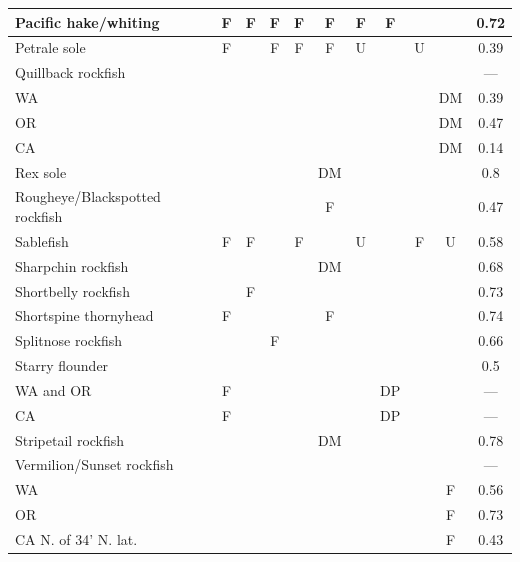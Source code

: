 \documentclass[11pt,
  english,
  a4paper,
]{article}
\begin{document}
\begin{landscape}
\begin{longtable}[t]{>{\raggedright\arraybackslash}p{6cm}lcccccccccc}
\midrule
Pacific hake/whiting &  & F & F & F & F & F & F & F &  &  & 0.72\\
\midrule
Petrale sole &  & F &  & F & F & F & U &  & U &  & 0.39\\
\midrule
Quillback rockfish &  &  &  &  &  &  &  &  &  &  & ---\\
\midrule
\hspace{3mm}WA &  &  &  &  &  &  &  &  &  & DM & 0.39\\
\midrule
\hspace{3mm}OR &  &  &  &  &  &  &  &  &  & DM & 0.47\\
\midrule
\hspace{3mm}CA &  &  &  &  &  &  &  &  &  & DM & 0.14\\
\midrule
Rex sole &  &  &  &  &  & DM &  &  &  &  & 0.8\\
\midrule
Rougheye/Blackspotted rockfish &  &  &  &  &  & F &  &  &  &  & 0.47\\
\midrule
Sablefish &  & F & F &  & F &  & U &  & F & U & 0.58\\
\midrule
Sharpchin rockfish &  &  &  &  &  & DM &  &  &  &  & 0.68\\
\midrule
Shortbelly rockfish &  &  & F &  &  &  &  &  &  &  & 0.73\\
\midrule
Shortspine thornyhead &  & F &  &  &  & F &  &  &  &  & 0.74\\
\midrule
Splitnose rockfish &  &  &  & F &  &  &  &  &  &  & 0.66\\
\midrule
Starry flounder &  &  &  &  &  &  &  &  &  &  & 0.5\\
\midrule
\hspace{3mm} WA and OR &  & F &  &  &  &  &  & DP &  &  & ---\\
\midrule
\hspace{3mm}CA &  & F &  &  &  &  &  & DP &  &  & ---\\
\midrule
Stripetail rockfish &  &  &  &  &  & DM &  &  &  &  & 0.78\\
\midrule
Vermilion/Sunset rockfish &  &  &  &  &  &  &  &  &  &  & ---\\
\midrule
\hspace{3mm}WA &  &  &  &  &  &  &  &  &  & F & 0.56\\
\midrule
\hspace{3mm}OR &  &  &  &  &  &  &  &  &  & F & 0.73\\
\midrule
\hspace{3mm}CA N. of 34\textdegree 47' N. lat. &  &  &  &  &  &  &  &  &  & F & 0.43\\

\end{longtable}
\end{landscape}
\end{document}
